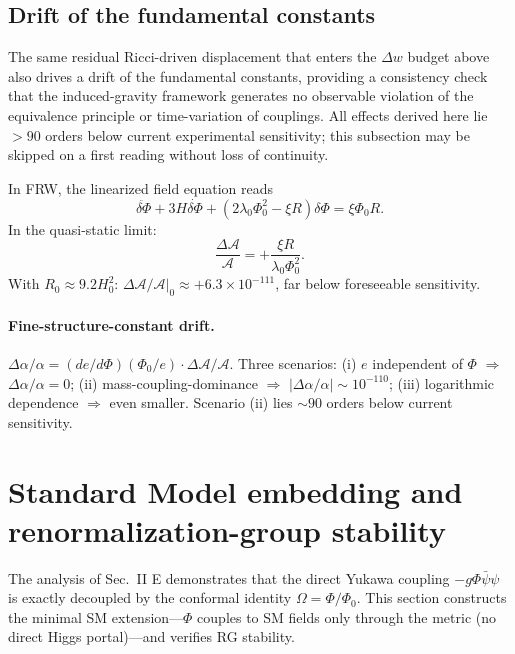 \documentclass[pdflatex,sn-mathphys-num]{sn-jnl}
\newcommand{\PhiV}{\Phi_0}
\theoremstyle{thmstyleone}
\begin{document}
\subsection{Drift of the fundamental constants}

The same residual Ricci-driven displacement that enters the $\Delta w$ budget above also drives a drift of the fundamental constants, providing a consistency check that the induced-gravity framework generates no observable violation of the equivalence principle or time-variation of couplings. All effects derived here lie $>90$ orders below current experimental sensitivity; this subsection may be skipped on a first reading without loss of continuity.

In FRW, the linearized field equation reads
\begin{equation}
\ddot{\delta\Phi}+3H\dot{\delta\Phi}+(2\lambda_0\PhiV^2-\xi R)\delta\Phi=\xi\PhiV R.
\label{eq:linPhi}
\end{equation}
In the quasi-static limit:
\begin{equation}
\frac{\Delta\mathcal{A}}{\mathcal{A}}=+\frac{\xi R}{\lambda_0\PhiV^2}.
\label{eq:dA}
\end{equation}
With $R_0\approx9.2H_0^2$: $\Delta\mathcal{A}/\mathcal{A}|_0\approx+6.3\times10^{-111}$, far below foreseeable sensitivity.

\paragraph{Fine-structure-constant drift.} $\Delta\alpha/\alpha=(de/d\Phi)(\PhiV/e)\cdot\Delta\mathcal{A}/\mathcal{A}$. Three scenarios: (i) $e$ independent of $\Phi$ $\Rightarrow$ $\Delta\alpha/\alpha=0$; (ii) mass-coupling-dominance $\Rightarrow$ $|\Delta\alpha/\alpha|\sim10^{-110}$; (iii) logarithmic dependence $\Rightarrow$ even smaller. Scenario (ii) lies $\sim90$ orders below current sensitivity.

\section{Standard Model embedding and renormalization-group stability}

The analysis of Sec.~II E demonstrates that the direct Yukawa coupling $-g\Phi\bar\psi\psi$ is exactly decoupled by the conformal identity $\Omega=\Phi/\PhiV$. This section constructs the minimal SM extension---$\Phi$ couples to SM fields only through the metric (no direct Higgs portal)---and verifies RG stability.
\end{document}
